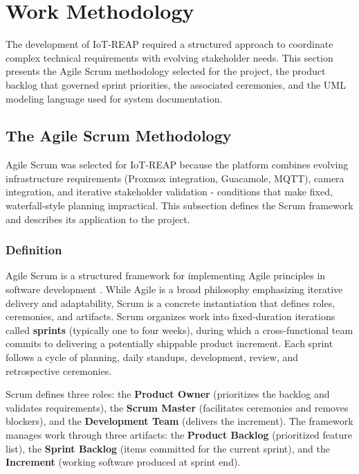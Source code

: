\section{Work Methodology}
\label{sec:work_methodology}

The development of IoT-REAP required a structured approach to coordinate complex
technical requirements with evolving stakeholder needs. This section presents the
Agile Scrum methodology selected for the project, the product backlog that governed
sprint priorities, the associated ceremonies, and the UML modeling language used for
system documentation.

\subsection{The Agile Scrum Methodology}

Agile Scrum was selected for IoT-REAP because the platform combines evolving
infrastructure requirements (Proxmox integration, Guacamole, MQTT), camera
integration, and iterative stakeholder validation - conditions that make
fixed, waterfall-style planning impractical. This subsection defines the Scrum
framework and describes its application to the project.

\subsubsection{Definition}

Agile Scrum is a structured framework for implementing Agile principles in software
development {\footnotesize\cite{agile}}. While Agile is a broad philosophy emphasizing
iterative delivery and adaptability, Scrum is a concrete instantiation that defines
roles, ceremonies, and artifacts. Scrum organizes work into fixed-duration iterations
called \textbf{sprints} (typically one to four weeks), during which a cross-functional
team commits to delivering a potentially shippable product increment. Each sprint
follows a cycle of planning, daily standups, development, review, and retrospective
ceremonies.

Scrum defines three roles: the \textbf{Product Owner} (prioritizes the backlog and
validates requirements), the \textbf{Scrum Master} (facilitates ceremonies and removes
blockers), and the \textbf{Development Team} (delivers the increment). The framework
manages work through three artifacts: the \textbf{Product Backlog} (prioritized
feature list), the \textbf{Sprint Backlog} (items committed for the current sprint),
and the \textbf{Increment} (working software produced at sprint end).

